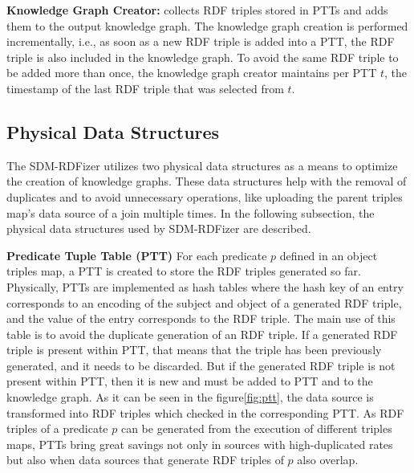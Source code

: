 \noindent\textbf{Knowledge Graph Creator:} collects RDF triples stored in PTTs and adds them to the output knowledge graph. The knowledge graph creation is performed incrementally, i.e., as soon as a new RDF triple is added into a PTT, the RDF triple is also included in the knowledge graph. To avoid the same RDF triple to be added more than once, the knowledge graph creator maintains per PTT $t$, the timestamp of the last RDF triple that was selected from $t$. 

\subsection{Physical Data Structures}
The SDM-RDFizer utilizes two physical data structures as a means to optimize the creation of knowledge graphs. These data structures help with the removal of duplicates and to avoid unnecessary operations, like uploading the parent triples map's data source of a join multiple times. In the following subsection, the physical data structures used by SDM-RDFizer are described. 
\label{pds}

\noindent\textbf{Predicate Tuple Table (PTT)} 
For each predicate $p$ defined in an object triples map, a PTT is created to store the RDF triples generated so far. Physically, PTTs are implemented as hash tables where the hash key of an entry corresponds to an encoding of the subject and object of a generated RDF triple, and the value of the entry corresponds to the RDF triple. The main use of this table is to avoid the duplicate generation of an RDF triple. 
If a generated RDF triple is present within PTT, that means that the triple has been previously generated, and it needs to be discarded. But if the generated RDF triple is not present within PTT, then it is new and must be added to PTT and to the knowledge graph. As it can be seen in the figure\autoref{fig:ptt}, the data source is transformed into RDF triples which checked in the corresponding PTT. As RDF triples of a predicate $p$ can be generated from the execution of different triples maps, PTTs bring great savings not only in sources with high-duplicated rates but also when data sources that generate RDF triples of $p$ also overlap.  

